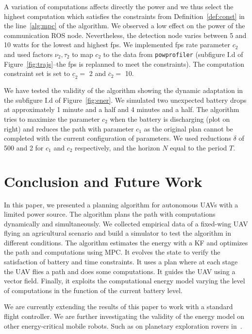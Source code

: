 \documentclass[letterpaper,10pt,conference]{ieeeconf}
\newcommand{\stt}[1]{{\small\tt #1}} %
\newcommand{\powprof}{\stt{powprofiler}}
\theoremstyle{definition}
\begin{document}
A variation of computations affects directly the power and we thus select the highest computation which satisfies the constraints from Definition~\ref{def:const} in the line~\ref{alg:mpc} of the algorithm. We observed a low effect on the power of the communication ROS node. Nevertheless, the detection node varies between 5 and 10 watts for the lowest and highest fps. We implemented fps rate parameter $c_2$ and used factors  $\nu_2,\tau_2$ to map $c_2$ to the data from \powprof{} (subfigure I.d of Figure~\ref{fig:trajs}--the fps is replanned to meet the constraints). The computation constraint set is set to $\underline{c}_2=$ 2 and $\overline{c}_2=$ 10.

We have tested the validity of the algorithm showing the dynamic adaptation in the subfigure I.d of Figure~\ref{fig:ener}. We simulated two unexpected battery drops at approximately 1 minute and a half and 4 minutes and a half. The algorithm tries to maximize the parameter $c_2$ when the battery is discharging (plot on right) and reduces the path with parameter $c_1$ as the original plan cannot be completed with the current configuration of parameters. We used reductions $\delta$ of 500 and 2 for $c_1$ and $c_2$ respectively, and the horizon $N$ equal to the period $T$.


\section{Conclusion and Future Work}  %
\label{sec:conclusion}                %
In this paper, we presented a planning algorithm for autonomous UAVs with a limited power source. The algorithm plans the path with computations dynamically and simultaneously. We collected empirical data of a fixed-wing UAV flying an agricultural scenario and build a simulator to test the algorithm in different conditions. The algorithm estimates the energy with a KF and optimizes the path and computations using MPC. It evolves the state to verify the satisfaction of battery and time constraints. It uses a plan where at each stage the UAV flies a path and does some computations. It guides the UAV using a vector field. Finally, it exploits the computational energy model varying the level of computations in the function of the current battery level.

We are currently extending the results of this paper to work with a standard flight controller. We are further investigating the validity of the energy model on other energy-critical mobile robots. Such as on planetary exploration rovers in~\cite{seewald2020beyond}.
\end{document}
